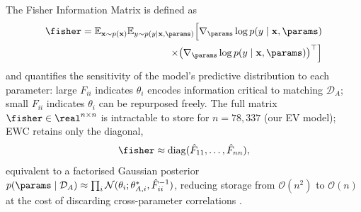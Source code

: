 The Fisher Information Matrix is defined as
\begin{equation}
\begin{split}
    \fisher = \mathbb{E}_{\mathbf{x} \sim p(\mathbf{x})}
    \mathbb{E}_{y \sim p(y \mid \mathbf{x}, \params)}
    \Bigl[ \nabla_{\params} \log p(y \mid \mathbf{x}, \params) \\
    \times \bigl(\nabla_{\params} \log p(y \mid \mathbf{x}, \params)\bigr)^\top \Bigr]
\end{split}
\label{eq:fisher_full}
\end{equation}
and quantifies the sensitivity of the model's predictive distribution
to each parameter: large $F_{ii}$ indicates $\theta_i$ encodes
information critical to matching $\mathcal{D}_A$; small $F_{ii}$
indicates $\theta_i$ can be repurposed freely. The full matrix
$\fisher \in \real^{n\times n}$ is intractable to store for
$n = 78{,}337$ (our EV model); EWC retains only the diagonal,
\begin{equation}
    \fisher \approx \mathrm{diag}(\hat{F}_{11}, \ldots, \hat{F}_{nn}),
    \label{eq:diag_approx}
\end{equation}
equivalent to a factorised Gaussian posterior
$p(\params \mid \mathcal{D}_A) \approx \prod_i \mathcal{N}(\theta_i;
\theta_{A,i}^*, \hat{F}_{ii}^{-1})$, reducing storage from
$\mathcal{O}(n^2)$ to $\mathcal{O}(n)$ at the cost of discarding
cross-parameter correlations .


